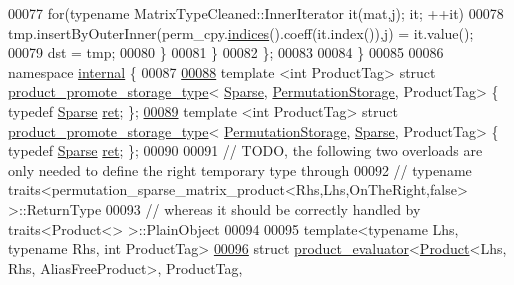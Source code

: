 \begin{DoxyCode}
00077           \textcolor{keywordflow}{for}(\textcolor{keyword}{typename} MatrixTypeCleaned::InnerIterator it(mat,j); it; ++it)
00078             tmp.insertByOuterInner(perm\_cpy.\hyperlink{group___core___module_a2f1ab379207fcd1ceb33941e25cf50c2}{indices}().coeff(it.index()),j) = it.value();
00079         dst = tmp;
00080       \}
00081     \}
00082 \};
00083 
00084 \}
00085 
00086 \textcolor{keyword}{namespace }\hyperlink{namespaceinternal}{internal} \{
00087 
\hyperlink{struct_eigen_1_1internal_1_1product__promote__storage__type_3_01_sparse_00_01_permutation_storage_00_01_product_tag_01_4}{00088} \textcolor{keyword}{template} <\textcolor{keywordtype}{int} ProductTag> \textcolor{keyword}{struct }\hyperlink{struct_eigen_1_1internal_1_1product__promote__storage__type}{product\_promote\_storage\_type}<
      \hyperlink{struct_eigen_1_1_sparse}{Sparse},             \hyperlink{struct_eigen_1_1_permutation_storage}{PermutationStorage}, ProductTag> \{ \textcolor{keyword}{typedef} 
      \hyperlink{struct_eigen_1_1_sparse}{Sparse} \hyperlink{struct_eigen_1_1_sparse}{ret}; \};
\hyperlink{struct_eigen_1_1internal_1_1product__promote__storage__type_3_01_permutation_storage_00_01_sparse_00_01_product_tag_01_4}{00089} \textcolor{keyword}{template} <\textcolor{keywordtype}{int} ProductTag> \textcolor{keyword}{struct }\hyperlink{struct_eigen_1_1internal_1_1product__promote__storage__type}{product\_promote\_storage\_type}<
      \hyperlink{struct_eigen_1_1_permutation_storage}{PermutationStorage}, \hyperlink{struct_eigen_1_1_sparse}{Sparse},             ProductTag> \{ \textcolor{keyword}{typedef} 
      \hyperlink{struct_eigen_1_1_sparse}{Sparse} \hyperlink{struct_eigen_1_1_sparse}{ret}; \};
00090 
00091 \textcolor{comment}{// TODO, the following two overloads are only needed to define the right temporary type through }
00092 \textcolor{comment}{// typename traits<permutation\_sparse\_matrix\_product<Rhs,Lhs,OnTheRight,false> >::ReturnType}
00093 \textcolor{comment}{// whereas it should be correctly handled by traits<Product<> >::PlainObject}
00094 
00095 \textcolor{keyword}{template}<\textcolor{keyword}{typename} Lhs, \textcolor{keyword}{typename} Rhs, \textcolor{keywordtype}{int} ProductTag>
\hyperlink{struct_eigen_1_1internal_1_1product__evaluator_3_01_product_3_01_lhs_00_01_rhs_00_01_alias_free_0706ef7a5a2e7de13f2e1755913a650d}{00096} \textcolor{keyword}{struct }\hyperlink{struct_eigen_1_1internal_1_1product__evaluator}{product\_evaluator}<\hyperlink{group___core___module_class_eigen_1_1_product}{Product}<Lhs, Rhs, AliasFreeProduct>, ProductTag, 

\end{DoxyCode}
